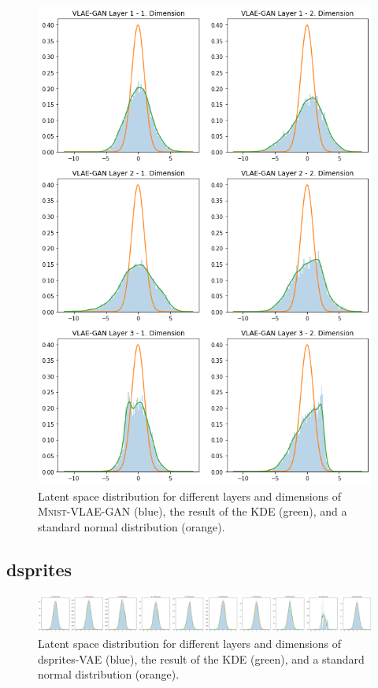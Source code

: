 \begin{figure}[H]
    \centering
    \includegraphics[width=\textwidth]{images/generated_vs_true/mnist/vlae_gan_kde.png}
    \caption[\textsc{Mnist}-VLAE-GAN - Estimated Latent Space Distribution]{Latent space distribution for different layers and dimensions of \textsc{Mnist}-\ac{VLAE}-\ac{GAN} (blue), the result of the \ac{KDE} (green), and a standard normal distribution (orange).}
\end{figure}

\subsection{dsprites}\label{subsec:appendix_pixel_wise_statistics_dsprites}
\begin{figure}[H]
    \centering
    \includegraphics[width=\textwidth]{images/generated_vs_true/dsprites/vae_kde.png}
    \caption[dsprites-VAE - Estimated Latent Space Distribution]{Latent space distribution for different layers and dimensions of dsprites-\ac{VAE} (blue), the result of the \ac{KDE} (green), and a standard normal distribution (orange).}
\end{figure}

